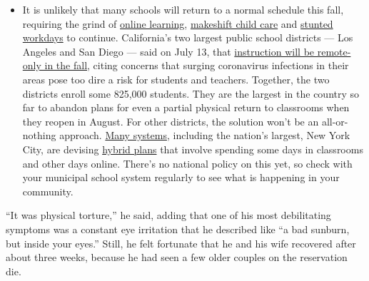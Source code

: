 \begin{itemize}
  \begin{itemize}
  \tightlist
  \item
    It is unlikely that many schools will return to a normal schedule
    this fall, requiring the grind of
    \href{https://www.nytimes.com/2020/06/05/us/coronavirus-education-lost-learning.html?action=click\&pgtype=Article\&state=default\&region=MAIN_CONTENT_3\&context=storylines_faq}{online
    learning},
    \href{https://www.nytimes.com/2020/05/29/us/coronavirus-child-care-centers.html?action=click\&pgtype=Article\&state=default\&region=MAIN_CONTENT_3\&context=storylines_faq}{makeshift
    child care} and
    \href{https://www.nytimes.com/2020/06/03/business/economy/coronavirus-working-women.html?action=click\&pgtype=Article\&state=default\&region=MAIN_CONTENT_3\&context=storylines_faq}{stunted
    workdays} to continue. California's two largest public school
    districts --- Los Angeles and San Diego --- said on July 13, that
    \href{https://www.nytimes.com/2020/07/13/us/lausd-san-diego-school-reopening.html?action=click\&pgtype=Article\&state=default\&region=MAIN_CONTENT_3\&context=storylines_faq}{instruction
    will be remote-only in the fall}, citing concerns that surging
    coronavirus infections in their areas pose too dire a risk for
    students and teachers. Together, the two districts enroll some
    825,000 students. They are the largest in the country so far to
    abandon plans for even a partial physical return to classrooms when
    they reopen in August. For other districts, the solution won't be an
    all-or-nothing approach.
    \href{https://bioethics.jhu.edu/research-and-outreach/projects/eschool-initiative/school-policy-tracker/}{Many
    systems}, including the nation's largest, New York City, are
    devising
    \href{https://www.nytimes.com/2020/06/26/us/coronavirus-schools-reopen-fall.html?action=click\&pgtype=Article\&state=default\&region=MAIN_CONTENT_3\&context=storylines_faq}{hybrid
    plans} that involve spending some days in classrooms and other days
    online. There's no national policy on this yet, so check with your
    municipal school system regularly to see what is happening in your
    community.
  \end{itemize}
\end{itemize}

``It was physical torture,'' he said, adding that one of his most
debilitating symptoms was a constant eye irritation that he described
like ``a bad sunburn, but inside your eyes.'' Still, he felt fortunate
that he and his wife recovered after about three weeks, because he had
seen a few older couples on the reservation die.

